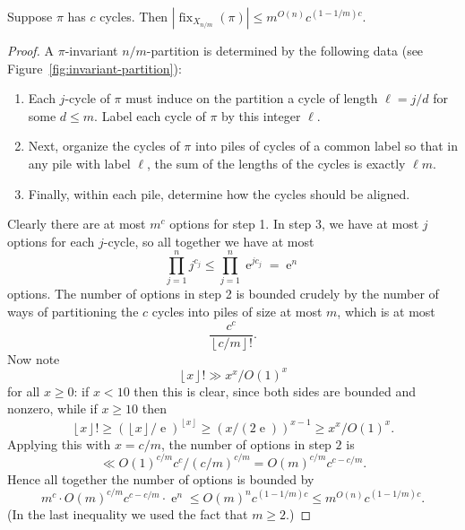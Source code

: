 \documentclass[ALCO,ThmDefs,Unicode,epreuves]{cedram}
\DeclareMathOperator{\fix}{fix}
\DeclareMathOperator{\expe}{e}
\newcommand\floor[1]{\left\lfloor{#1}\right\rfloor}
\begin{document}
\begin{lemma}\label{imprimitive_large_k_bound}
Suppose $\pi$ has $c$ cycles. Then $|\fix_{X_{n/m}}(\pi)| \leq m^{O(n)} c^{(1-1/m)c}$.
\end{lemma}
\begin{proof}
A $\pi$-invariant $n/m$-partition is determined by the following data (see Figure~\ref{fig:invariant-partition}):
\begin{enumerate}
 \item\label{proof_lemm4.4_1} Each $j$-cycle of $\pi$ must induce on the partition a cycle of length $\ell = j/d$ for some $d \leq m$. Label each cycle of $\pi$ by this integer $\ell$.
 \item\label{proof_lemm4.4_2} Next, organize the cycles of $\pi$ into piles of cycles of a common label so that in any pile with label $\ell$, the sum of the lengths of the cycles is exactly $\ell m$.
 \item\label{proof_lemm4.4_3} Finally, within each pile, determine how the cycles should be aligned.
\end{enumerate}
Clearly there are at most $m^c$ options for step 1. In step 3, we have at most $j$ options for each $j$-cycle, so all together we have at most
\[
 \prod_{j=1}^n j^{c_j} \leq \prod_{j=1}^n \expe^{j c_j} = \expe^n
\]
options. The number of options in step 2 is bounded crudely by the number of ways of partitioning the $c$ cycles into piles of size at most $m$, which is at most
\[
 \frac{c^c}{\floor{c/m}!}.
\]
Now note
\[
 \floor{x}! \gg x^x / O(1)^x
\]
for all $x \geq 0$: if $x < 10$ then this is clear, since both sides are bounded and nonzero, while if $x \geq 10$ then
\[
 \floor{x}! \geq (\floor{x}/\expe)^{\floor{x}} \geq (x/(2\expe))^{x-1} \geq x^x / O(1)^x.
\]
Applying this with $x = c/m$, the number of options in step $2$ is
\[
 \ll O(1)^{c/m} c^c / (c/m)^{c/m} = O(m)^{c/m} c^{c - c/m}.
\]
Hence all together the number of options is bounded by
\[
 m^c \cdot O(m)^{c/m} c^{c-c/m} \cdot \expe^n \leq O(m)^n c^{(1-1/m)c}
 \leq m^{O(n)} c^{(1-1/m)c}.
\]
(In the last inequality we used the fact that $m \geq 2$.)
\end{proof}
\end{document}

